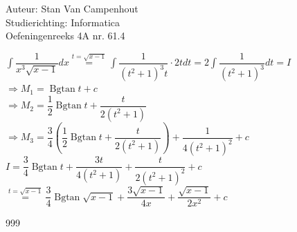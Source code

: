 \documentclass[a4paper]{article}
\begin{document}
  
\noindent \large Auteur: Stan Van Campenhout \\
\noindent \large Studierichting:  Informatica\\
\noindent \large Oefeningenreeks 4A nr. 61.4\\

\medskip

\normalsize

$ \displaystyle\int\dfrac{1}{x^3\sqrt{x-1}}dx \stackrel{t = \sqrt{x-1}}{=} \displaystyle\int\dfrac{1}{\left(t^2+1\right)^3t}\cdot2tdt
= 2\displaystyle\int\dfrac{1}{\left(t^2+1\right)^3}dt = I $\\

$ \Rightarrow M_1 = \operatorname{Bgtan}t + c $\\

$ \Rightarrow M_2 = \dfrac{1}{2}\operatorname{Bgtan}t+\dfrac{t}{2\left(t^2+1\right)} $\\

$ \Rightarrow M_3 = \dfrac{3}{4}\left(\dfrac{1}{2}\operatorname{Bgtan}t+\dfrac{t}{2\left(t^2+1\right)}\right) + \dfrac{1}{4\left(t^2+1\right)^2} + c $\\

$ I = \dfrac{3}{4}\operatorname{Bgtan}t + \dfrac{3t}{4\left(t^2+1\right)}+\dfrac{t}{2\left(t^2+1\right)^2} + c $\\

$ \stackrel{t = \sqrt{x-1}}{=} \dfrac{3}{4}\operatorname{Bgtan}\sqrt{x-1} + \dfrac{3\sqrt{x-1}}{4x}+\dfrac{\sqrt{x-1}}{2x^2} + c $\\

\begin{thebibliography}{999}
\end{thebibliography}
\end{document}
